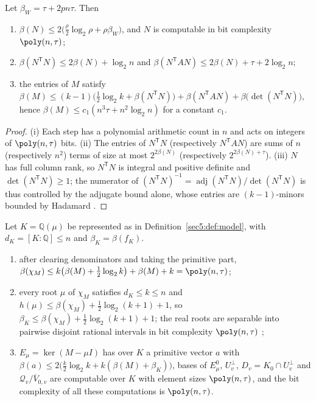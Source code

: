 \begin{lem}\label{appBC:lem:norm}\label{appBC:lem:comp}\label{appBC:cor:comp}
Let $\beta_W=\tau+2pn\tau$. Then
\begin{enumerate}[label=(\roman*),leftmargin=*]
\item $\beta(N)\le2\bigl(\frac{\rho}{2}\log_2\rho+\rho\beta_W\bigr)$, and $N$ is computable in bit
complexity $\poly(n,\tau)$;
\item $\beta(N^{\mathsf T}N)\le2\beta(N)+\log_2 n$ and
$\beta(N^{\mathsf T}AN)\le2\beta(N)+\tau+2\log_2 n$;
\item the entries of $M$ satisfy
$\beta(M)\le(k-1)\bigl(\tfrac12\log_2 k+\beta(N^{\mathsf T}N)\bigr)+\beta(N^{\mathsf T}AN)+\beta\bigl(\det(N^{\mathsf T}N)\bigr)$,
hence $\beta(M)\le c_1(n^{3}\tau+n^{2}\log_2 n)$ for a constant $c_1$.
\end{enumerate}
\end{lem}

\begin{proof}
(i) Each step has a polynomial arithmetic count in $n$ and acts on integers of $\poly(n,\tau)$ bits.
(ii) The entries of $N^{\mathsf T}N$ (respectively $N^{\mathsf T}AN$) are sums of $n$ (respectively
$n^{2}$) terms of size at most $2^{2\beta(N)}$ (respectively $2^{2\beta(N)+\tau}$). (iii) $N$ has full
column rank, so $N^{\mathsf T}N$ is integral and positive definite and $\det(N^{\mathsf T}N)\ge1$; the
numerator of $(N^{\mathsf T}N)^{-1}=\operatorname{adj}(N^{\mathsf T}N)/\det(N^{\mathsf T}N)$ is thus
controlled by the adjugate bound alone, whose entries are $(k-1)$-minors bounded by Hadamard
\cite{hj13,vzgg03}.
\end{proof}

\begin{lem}\label{appBC:lem:charpoly}\label{appBC:lem:root}\label{appBC:cor:root}\label{appBC:lem:bases}\label{appBC:sub:roots}
Let $K=\mathbb{Q}(\mu)$ be represented as in Definition~\ref{sec5:def:model}, with
$d_K=[K:\mathbb{Q}]\le n$ and $\beta_K=\beta(f_K)$.
\begin{enumerate}[label=(\roman*),leftmargin=*]
\item after clearing denominators and taking the primitive part,
$\beta(\chi_M)\le k\bigl(\beta(M)+\tfrac12\log_2 k\bigr)+\beta(M)+k=\poly(n,\tau)$;
\item every root $\mu$ of $\chi_M$ satisfies $d_K\le k\le n$ and
$h(\mu)\le\beta(\chi_M)+\tfrac12\log_2(k+1)+1$, so $\beta_K\le\beta(\chi_M)+\tfrac12\log_2(k+1)+1$;
the real roots are separable into pairwise disjoint rational intervals in bit complexity
$\poly(n,\tau)$ \cite{bpr06};
\item $E_\mu=\ker(M-\mu I)$ has over $K$ a primitive vector $a$ with
$\beta(a)\le2\bigl(\tfrac k2\log_2 k+k(\beta(M)+\beta_K)\bigr)$, bases of $E_\mu^0$,
$U_v^\perp$, $D_v=K_0\cap U_v^\perp$ and $\mathcal{Q}_v/\overline{V}_{0,v}$ are computable over $K$
with element sizes $\poly(n,\tau)$, and the bit complexity of all these computations is
$\poly(n,\tau)$.
\end{enumerate}
\end{lem}

